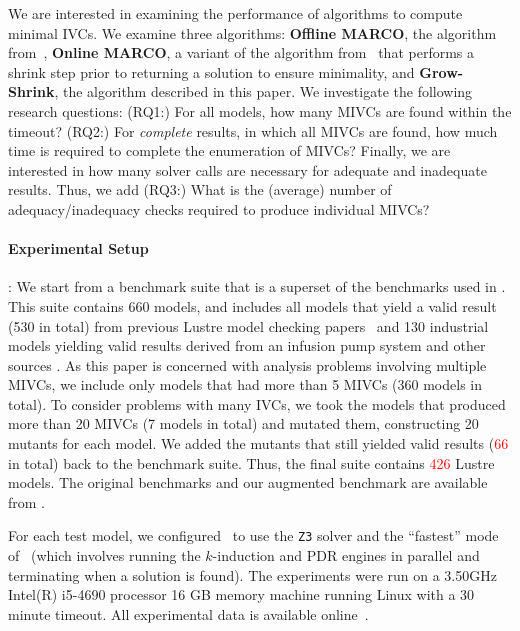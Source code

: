 We are interested in examining the performance of algorithms to compute minimal IVCs.  We examine three algorithms: \textbf{Offline MARCO}, the algorithm from~\cite{Ghass17AllIVCs}, \textbf{Online MARCO}, a variant of the algorithm from~\cite{Ghass17AllIVCs} that performs a shrink step prior to returning a solution to ensure minimality, and \textbf{Grow-Shrink}, the algorithm described in this paper.  We investigate the following research questions: (RQ1:) For all models, how many MIVCs are found within the timeout?  (RQ2:) For {\em complete} results, in which all MIVCs are found, how much time is required to complete the enumeration of MIVCs?  Finally, we are interested in how many solver calls are necessary for adequate and inadequate results.  Thus, we add (RQ3:) What is the (average) number of adequacy/inadequacy checks required to produce individual MIVCs?


\paragraph{Experimental Setup}:  We start from a benchmark suite that is a superset of the benchmarks used in \cite{Ghass17AllIVCs}. This suite contains 660 models, and includes all models that yield a valid result (530 in total) from previous Lustre model checking papers~\cite{Hagen08:FMCAD,piskac2016} and 130 industrial models yielding valid results derived from an infusion pump system \cite{hilt2013} and other sources \cite{piskac2016,NFM2015:backes}.
As this paper is concerned with analysis problems involving multiple MIVCs, we include only models that had more than 5 MIVCs (360 models in total).  To consider problems with many IVCs, we took the models that produced more than 20 MIVCs (7 models in total) and mutated them, constructing 20 mutants for each model.  We added the mutants that still yielded valid results (\textcolor{red}{66} in total) back to the benchmark suite.
Thus, the final suite contains \textcolor{red}{426} Lustre models. The original benchmarks and our augmented benchmark are available from \cite{bench}.

For each test model, we configured \jkind\ to use the \texttt{Z3} solver and the ``fastest'' mode of \jkind\ (which involves running the $k$-induction and PDR engines in parallel and terminating when a solution is found). The experiments were run on a  3.50GHz  Intel(R) i5-4690 processor 16 GB memory machine running Linux with a 30 minute timeout.  All experimental data is available online~\cite{expr}.

